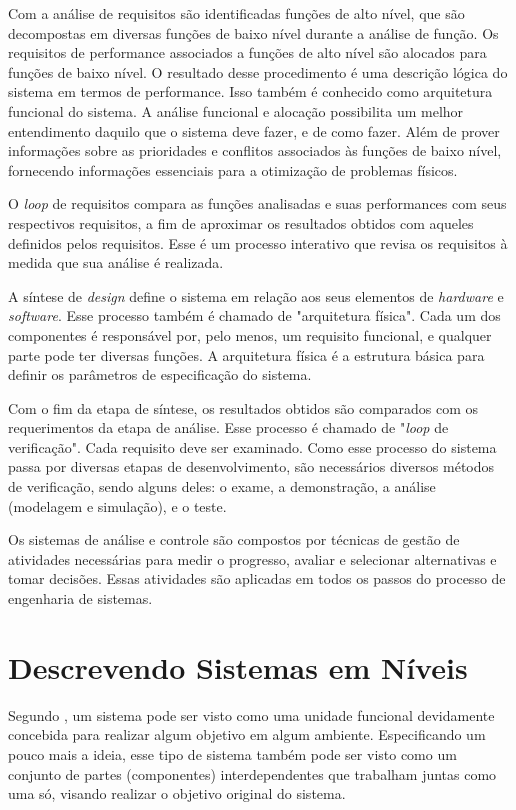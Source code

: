     Com a análise de requisitos são identificadas funções de alto nível, que são decompostas em diversas funções de baixo nível durante a análise de função. Os requisitos de performance associados a funções de alto nível são alocados para funções de baixo nível. O resultado desse procedimento é uma descrição lógica do sistema em termos de performance. Isso também é conhecido como arquitetura funcional do sistema. A análise funcional e alocação possibilita um melhor entendimento daquilo que o sistema deve fazer, e de como fazer. Além de prover informações sobre as prioridades e conflitos associados às funções de baixo nível, fornecendo informações essenciais para a otimização de problemas físicos.
    
    O \textit{loop} de requisitos compara as funções analisadas e suas performances com seus respectivos requisitos, a fim de aproximar os resultados obtidos com aqueles definidos pelos requisitos. Esse é um processo interativo que revisa os requisitos à medida que sua análise é realizada. 
    
    A síntese de \textit{design} define o sistema em relação aos seus elementos de \textit{hardware} e \textit{software}. Esse processo também é chamado de "arquitetura física". Cada um dos componentes é responsável por, pelo menos, um requisito funcional, e qualquer parte pode ter diversas funções. A arquitetura física é a estrutura básica para definir os parâmetros de especificação do sistema.

    Com o fim da etapa de síntese, os resultados obtidos são comparados com os requerimentos da etapa de análise. Esse processo é chamado de "\textit{loop} de verificação". Cada requisito deve ser examinado. Como esse processo do sistema passa por diversas etapas de desenvolvimento, são necessários diversos métodos de verificação, sendo alguns deles: o exame, a demonstração, a análise (modelagem e simulação), e o teste.
    
    Os sistemas de análise e controle são compostos por técnicas de gestão de atividades necessárias para medir o progresso, avaliar e selecionar alternativas e tomar decisões. Essas atividades são aplicadas em todos os passos do processo de engenharia de sistemas.

\section{Descrevendo Sistemas em Níveis}
\label{sec:abord-def-nivel}

    Segundo \cite{wilensky1999thinking}, um sistema pode ser visto como uma unidade funcional devidamente concebida para realizar algum objetivo em algum ambiente. Especificando um pouco mais a ideia, esse tipo de sistema também pode ser visto como um conjunto de partes (componentes) interdependentes que trabalham juntas como uma só, visando realizar o objetivo original do sistema.%
    
